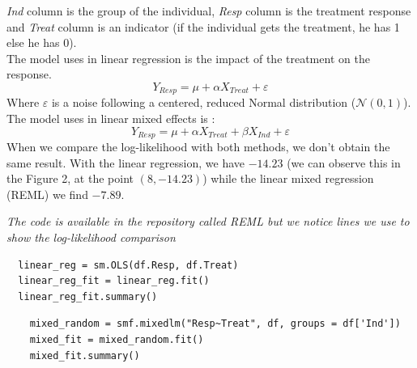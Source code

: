 \documentclass{article}
\begin{document}
\textit{Ind} column is the group of the individual, \textit{Resp} column is the treatment response and \textit{Treat} column is an indicator (if the individual gets the treatment, he has 1 else he has 0).\\
The model uses in linear regression is the impact of the treatment on the response.
\begin{equation*}
    Y_{Resp} = \mu +  \alpha X_{Treat} + \varepsilon
\end{equation*}
Where $\varepsilon$ is a noise following a centered, reduced Normal distribution ($\mathcal{N}(0, 1)$).\\
The model uses in linear mixed effects is :
\begin{equation*}
    Y_{Resp} = \mu + \alpha X_{Treat}  + \beta X_{Ind} +\varepsilon
\end{equation*}
When we compare the log-likelihood with both methods, we don't obtain the same result.
With the linear regression, we have $-14.23$ (we can observe this in the Figure 2, at the point $(8, -14.23)$) while the linear mixed regression (REML) we find $-7.89$.\\
\begin{remark}
\textit{The code is available in the repository called REML but we notice lines we use to show the log-likelihood comparison}
\end{remark}
\begin{lstlisting}
  linear_reg = sm.OLS(df.Resp, df.Treat)
  linear_reg_fit = linear_reg.fit()
  linear_reg_fit.summary()
\end{lstlisting}
\begin{lstlisting}
    mixed_random = smf.mixedlm("Resp~Treat", df, groups = df['Ind'])
    mixed_fit = mixed_random.fit()
    mixed_fit.summary() 
\end{lstlisting}
\end{document}
